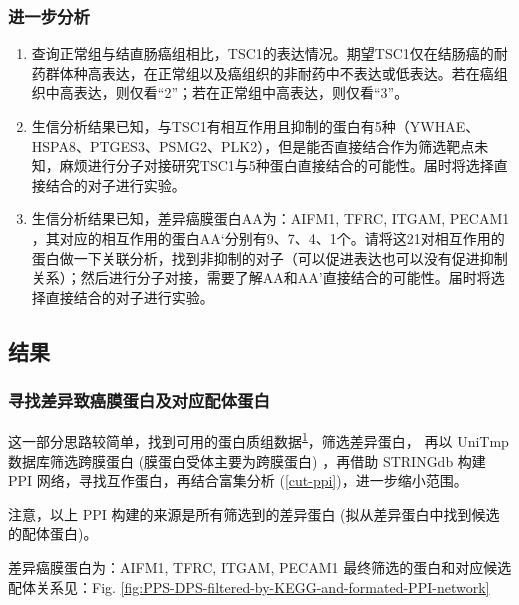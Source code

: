 \documentclass[
]{article}
\providecommand{\tightlist}{%
  \setlength{\itemsep}{0pt}\setlength{\parskip}{0pt}}
\begin{document}
\hypertarget{fur}{%
\subsubsection{进一步分析}\label{fur}}

\begin{enumerate}
\def\labelenumi{\arabic{enumi}.}
\tightlist
\item
  查询正常组与结直肠癌组相比，TSC1的表达情况。期望TSC1仅在结肠癌的耐药群体种高表达，在正常组以及癌组织的非耐药中不表达或低表达。若在癌组织中高表达，则仅看``2''；若在正常组中高表达，则仅看``3''。
\item
  生信分析结果已知，与TSC1有相互作用且抑制的蛋白有5种（YWHAE、HSPA8、PTGES3、PSMG2、PLK2），但是能否直接结合作为筛选靶点未知，麻烦进行分子对接研究TSC1与5种蛋白直接结合的可能性。届时将选择直接结合的对子进行实验。
\item
  生信分析结果已知，差异癌膜蛋白AA为：AIFM1, TFRC, ITGAM, PECAM1 ，其对应的相互作用的蛋白AA`分别有9、7、4、1个。请将这21对相互作用的蛋白做一下关联分析，找到非抑制的对子（可以促进表达也可以没有促进抑制关系）；然后进行分子对接，需要了解AA和AA'直接结合的可能性。届时将选择直接结合的对子进行实验。
\end{enumerate}

\hypertarget{ux7ed3ux679c}{%
\subsection{结果}\label{ux7ed3ux679c}}

\hypertarget{ux5bfbux627eux5deeux5f02ux81f4ux764cux819cux86cbux767dux53caux5bf9ux5e94ux914dux4f53ux86cbux767d}{%
\subsubsection{寻找差异致癌膜蛋白及对应配体蛋白}\label{ux5bfbux627eux5deeux5f02ux81f4ux764cux819cux86cbux767dux53caux5bf9ux5e94ux914dux4f53ux86cbux767d}}

这一部分思路较简单，找到可用的蛋白质组数据\textsuperscript{\protect\hyperlink{ref-ProteomicsProfShao2022}{1}}，筛选差异蛋白，
再以 UniTmp 数据库筛选跨膜蛋白 (膜蛋白受体主要为跨膜蛋白) ，再借助 STRINGdb 构建
PPI 网络，寻找互作蛋白，再结合富集分析 (\ref{cut-ppi})，进一步缩小范围。

注意，以上 PPI 构建的来源是所有筛选到的差异蛋白 (拟从差异蛋白中找到候选的配体蛋白)。

差异癌膜蛋白为：AIFM1, TFRC, ITGAM, PECAM1
最终筛选的蛋白和对应候选配体关系见：Fig. \ref{fig:PPS-DPS-filtered-by-KEGG-and-formated-PPI-network}
\end{document}

